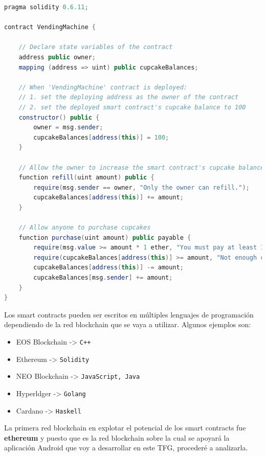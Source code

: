 \begin{lstlisting}[language=Java,float=ht,caption={[Smart Contract]Ejemplo de código fuente de un smart contract escrito en Solidity},label=lst:java]
pragma solidity 0.6.11;

contract VendingMachine {

    // Declare state variables of the contract
    address public owner;
    mapping (address => uint) public cupcakeBalances;

    // When 'VendingMachine' contract is deployed:
    // 1. set the deploying address as the owner of the contract
    // 2. set the deployed smart contract's cupcake balance to 100
    constructor() public {
        owner = msg.sender;
        cupcakeBalances[address(this)] = 100;
    }

    // Allow the owner to increase the smart contract's cupcake balance
    function refill(uint amount) public {
        require(msg.sender == owner, "Only the owner can refill.");
        cupcakeBalances[address(this)] += amount;
    }

    // Allow anyone to purchase cupcakes
    function purchase(uint amount) public payable {
        require(msg.value >= amount * 1 ether, "You must pay at least 1 ETH per cupcake");
        require(cupcakeBalances[address(this)] >= amount, "Not enough cupcakes in stock to complete this purchase");
        cupcakeBalances[address(this)] -= amount;
        cupcakeBalances[msg.sender] += amount;
    }
}
\end{lstlisting}

Los smart contracts pueden ser escritos en múltiples lenguajes de programación dependiendo de la red blockchain que se vaya a utilizar. Algunos ejemplos son:
\begin{itemize}
\item EOS Blockchain -> \verb|C++|
\item Ethereum -> \verb|Solidity|
\item NEO Blockchain -> \verb|JavaScript, Java|
\item Hyperldger -> \verb|Golang|
\item Cardano -> \verb|Haskell|
\end{itemize}

La primera red blockchain en explotar el potencial de los smart contracts fue \textbf{ethereum} y puesto que es la red blockchain sobre la cual se apoyará la aplicación Android que voy a desarrollar en este TFG, procederé a analizarla.

